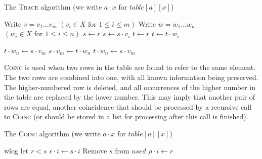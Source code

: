 \begin{algorithm}
\caption{The \textsc{Trace} algorithm (we write $a \cdot x$ for $table[a][x]$)}
\begin{algorithmic}[1]
\State Write $v = v_1 \dots v_m$ \Comment $(v_i \in X \text{~for~} 1 \leq i \leq m)$
\State Write $w = w_1 \dots w_n$ \Comment $(w_i \in X \text{~for~} 1 \leq i \leq n)$
\State $s \gets r$
    \State {}
  \EndIf
  \State $s \gets s \cdot v_i$
\EndFor
\State $t \gets r$
    \State {}
  \EndIf
  \State $t \gets t \cdot w_i$
\EndFor

  \State {}
  \State $t \cdot w_n \gets s \cdot v_m$
  \State $s \cdot v_m \gets t \cdot w_n$
  \State $t \cdot w_n \gets s \cdot v_m$
  \State {}
\EndIf

\EndProcedure
\end{algorithmic}
\end{algorithm}

\textsc{Coinc} is used when two rows in the table are found to refer to the same
element.  The two rows are combined into one, with all known information being
preserved.  The higher-numbered row is deleted, and all occurrences of the
higher number in the table are replaced by the lower number.  This may imply
that another pair of rows are equal, another coincidence that should be
processed by a recursive call to \textsc{Coinc} (or should be stored in a list
for processing after this call is finished).

\begin{algorithm}
\caption{The \textsc{Coinc} algorithm (we write $a \cdot x$ for $table[a][x]$)}
\begin{algorithmic}[1]
\State wlog let $r < s$
    \State $r \cdot i \gets s \cdot i$
    \State {}
  \EndIf
\EndFor
\State Remove $s$ from $used$
      \State $\rho \cdot i \gets r$
    \EndIf
  \EndFor
\EndFor
\EndProcedure
\end{algorithmic}
\end{algorithm}

